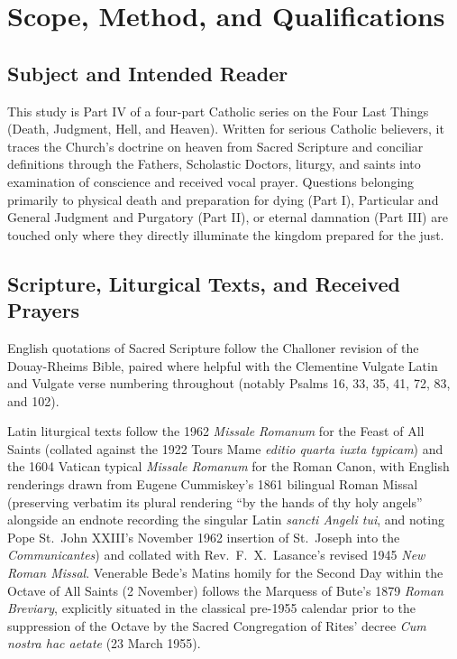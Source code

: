\section{Scope, Method, and Qualifications}

\subsection*{Subject and Intended Reader}

This study is Part IV of a four-part Catholic series on the Four Last Things (Death, Judgment, Hell, and Heaven). Written for serious Catholic believers, it traces the Church's doctrine on heaven from Sacred Scripture and conciliar definitions through the Fathers, Scholastic Doctors, liturgy, and saints into examination of conscience and received vocal prayer. Questions belonging primarily to physical death and preparation for dying (Part I), Particular and General Judgment and Purgatory (Part II), or eternal damnation (Part III) are touched only where they directly illuminate the kingdom prepared for the just.

\subsection*{Scripture, Liturgical Texts, and Received Prayers}

English quotations of Sacred Scripture follow the Challoner revision of the Douay-Rheims Bible, paired where helpful with the Clementine Vulgate Latin and Vulgate verse numbering throughout (notably Psalms 16, 33, 35, 41, 72, 83, and 102).

Latin liturgical texts follow the 1962 \textit{Missale Romanum} for the Feast of All Saints (collated against the 1922 Tours Mame \textit{editio quarta iuxta typicam}) and the 1604 Vatican typical \textit{Missale Romanum} for the Roman Canon, with English renderings drawn from Eugene Cummiskey's 1861 bilingual Roman Missal (preserving verbatim its plural rendering ``by the hands of thy holy angels'' alongside an endnote recording the singular Latin \textit{sancti Angeli tui}, and noting Pope St.\ John XXIII's November 1962 insertion of St.\ Joseph into the \textit{Communicantes}) and collated with Rev.\ F.\ X.\ Lasance's revised 1945 \textit{New Roman Missal}. Venerable Bede's Matins homily for the Second Day within the Octave of All Saints (2 November) follows the Marquess of Bute's 1879 \textit{Roman Breviary}, explicitly situated in the classical pre-1955 calendar prior to the suppression of the Octave by the Sacred Congregation of Rites' decree \textit{Cum nostra hac aetate} (23 March 1955).

